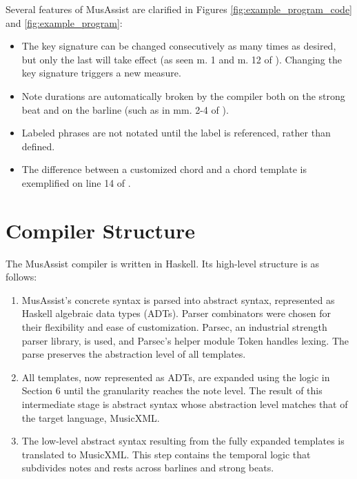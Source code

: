 \documentclass{article}
\begin{document}
Several features of MusAssist are clarified in Figures \ref{fig:example_program_code} and \ref{fig:example_program}:
\vspace{-2mm}
\begin{itemize}
\itemsep0em
\item The key signature can be changed consecutively as many times as desired, but only the last will take effect (as seen m. 1 and m. 12 of ). Changing the key signature triggers a new measure.
\item Note durations are automatically broken by the compiler both on the strong beat and on the barline (such as in mm. 2-4 of  ).
\item Labeled phrases are not notated until the label is referenced, rather than defined.
\item The difference between a customized chord and a chord template is exemplified on line 14 of .
\end{itemize}
\vspace{-5mm}

\section{Compiler Structure}\label{sec:compiler_structure}

The MusAssist compiler is written in Haskell. Its high-level structure is as follows: 

\begin{enumerate}
\itemsep0em 
  \item MusAssist’s concrete syntax is parsed into abstract syntax, represented as Haskell algebraic data types (ADTs). Parser combinators were chosen for their flexibility and ease of customization. Parsec, an industrial strength parser library, is used, and Parsec’s helper module Token handles lexing. The parse preserves the abstraction level of all templates.

  \item All templates, now represented as ADTs, are expanded using the logic in Section 6 until the granularity reaches the note level. The result of this intermediate stage is abstract syntax whose abstraction level matches that of the target language, MusicXML.

  \item The low-level abstract syntax resulting from the fully expanded templates is translated to MusicXML. This step contains the temporal logic that subdivides notes and rests across barlines and strong beats.
  
\end{enumerate}
\end{document}
